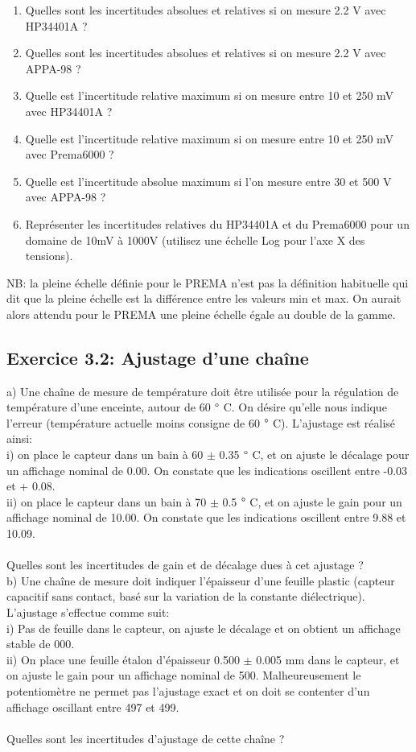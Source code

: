 \documentclass[main.tex]{subfiles}
\begin{document}
\begin{enumerate}
    \item Quelles sont les incertitudes absolues et relatives si on mesure 2.2 V avec HP34401A ?
    \item Quelles sont les incertitudes absolues et relatives si on mesure 2.2 V avec APPA-98 ?
    \item Quelle est l'incertitude relative maximum si on mesure entre 10 et 250 mV avec HP34401A ?
    \item Quelle est l'incertitude relative maximum si on mesure entre 10 et 250 mV avec Prema6000 ?
    \item Quelle est l'incertitude absolue maximum si l'on mesure entre 30 et 500 V avec APPA-98 ?
    \item Représenter les incertitudes relatives du HP34401A et du Prema6000 pour un domaine de 10mV à 1000V (utilisez une échelle Log pour l'axe X des tensions).
\end{enumerate}
NB: la pleine échelle définie pour le PREMA n'est pas la définition habituelle qui dit que la pleine échelle est la différence entre les valeurs min et max. On aurait alors attendu pour le PREMA une pleine échelle égale au double de la gamme.

\subsection*{Exercice 3.2: Ajustage d'une chaîne}
a)	Une chaîne de mesure de température doit être utilisée pour la régulation de température d'une enceinte, autour de 60 $\degree$ C. On désire qu'elle nous indique l'erreur (température actuelle moins consigne de 60 $\degree$ C). L'ajustage est réalisé ainsi: \\
i)	on place le capteur dans un bain à 60 $\pm$ 0.35 $\degree$ C, et on ajuste le décalage pour un affichage nominal de 0.00. On constate que les indications oscillent entre -0.03 et + 0.08. \\
ii)	on place le capteur dans un bain à 70 $\pm$ 0.5 $\degree$ C, et on ajuste le gain pour un affichage nominal de 10.00. On constate que les indications oscillent entre 9.88 et 10.09. \\  ~ \\
Quelles sont les incertitudes de gain et de décalage dues à cet ajustage ? \\

b)	Une chaîne de mesure doit indiquer l'épaisseur d'une feuille plastic (capteur capacitif sans contact, basé sur la variation de la constante diélectrique). L'ajustage s'effectue comme suit: \\
i)	Pas de feuille dans le capteur, on ajuste le décalage et on obtient un affichage stable de 000. \\
ii)	On place une feuille étalon d'épaisseur 0.500  $\pm$  0.005 mm dans le capteur, et on ajuste le gain pour un affichage nominal de 500. Malheureusement le potentiomètre ne permet pas l'ajustage exact et on doit se contenter d'un affichage oscillant entre 497 et 499. \\~ \\
Quelles sont les incertitudes d'ajustage de cette chaîne ? \\
\end{document}
